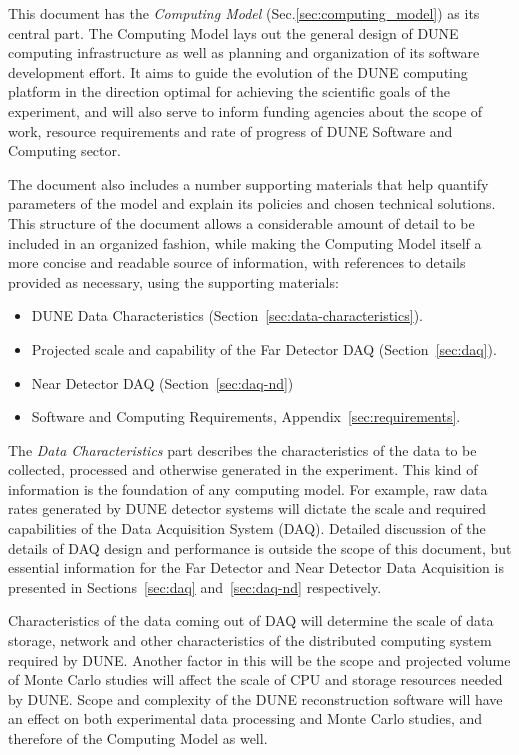 This document has the \textit{Computing Model} (Sec.\ref{sec:computing_model}) as its central part.
The Computing Model lays out the general design of DUNE computing infrastructure as well as planning and
organization of its software development effort. It aims to guide the evolution of the DUNE computing
platform in the direction optimal for achieving the scientific goals of the experiment, and will also serve
to inform funding agencies about the scope of work, resource requirements and rate of progress of 
DUNE Software and Computing sector.

The document also includes a number supporting materials that help quantify parameters of the model and
explain its policies and chosen technical solutions.
This structure of the document allows a considerable amount of detail to be included in an organized fashion,
while making the Computing Model itself a more concise and readable source of information, with
references to details provided as necessary, using the supporting materials:
\begin{itemize}
\item DUNE Data Characteristics (Section~\ref{sec:data-characteristics}).
\item Projected scale and capability of the Far Detector DAQ (Section~\ref{sec:daq}).
\item Near Detector DAQ (Section~\ref{sec:daq-nd})
\item Software and Computing Requirements, Appendix~\ref{sec:requirements}.
\end{itemize}

\noindent
The \textit{Data Characteristics} part describes the characteristics of the data to be collected, processed and otherwise generated in the experiment.
This kind of information is the foundation of any computing model.
For example, raw data rates generated by DUNE detector systems will dictate the scale and required capabilities of the Data
Acquisition System (DAQ).  Detailed discussion of the details of DAQ design and performance is outside the scope of this
document, but essential information for the Far Detector and Near Detector Data Acquisition is presented in Sections~\ref{sec:daq}
and~\ref{sec:daq-nd} respectively.

Characteristics of the data coming out of DAQ will determine the scale of data storage, network
and other characteristics of the distributed computing system required by DUNE. Another factor in this will be the scope and projected
volume of Monte Carlo studies  will affect the scale of CPU and storage resources needed by DUNE.  Scope and complexity of the DUNE
reconstruction software will have an effect on both experimental data processing and Monte Carlo studies, and therefore of the
Computing Model as well.

